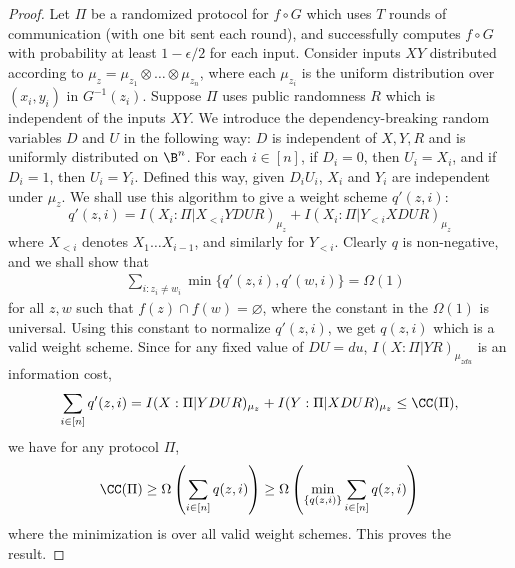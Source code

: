 \begin{proof}
Let $\Pi$ be a randomized protocol for $f\circ G$ which uses $T$ rounds
of communication (with one bit sent each round), and successfully computes $f\circ G$ with probability at least $1-\epsilon/2$ for each input. Consider inputs $XY$ distributed according to $\mu_z = \mu_{z_1}\otimes\ldots\otimes\mu_{z_n}$, where each $\mu_{z_i}$ is the uniform distribution over $(x_i,y_i)$ in $G^{-1}(z_i)$. Suppose $\Pi$ uses public randomness $R$ which is independent of the inputs $XY$. We introduce the dependency-breaking random variables $D$ and $U$ \cite{BJKS04} in the following way: $D$ is independent of $X, Y, R$ and is uniformly distributed on $\B^n$. For each $i \in [n]$, if $D_i=0$, then $U_i = X_i$, and if $D_i=1$, then $U_i=Y_i$. Defined this way, given $D_iU_i$, $X_i$ and $Y_i$ are independent under $\mu_z$. We shall use this algorithm to give a weight scheme $q'(z,i)$:
\[q'(z,i)=I(X_i:\Pi|X_{<i} YDUR)_{\mu_z} + I(X_i:\Pi|Y_{<i}XDUR)_{\mu_z}\]
where $X_{<i}$ denotes $X_1\ldots X_{i-1}$, and similarly for $Y_{<i}$. Clearly $q$ is non-negative, and we shall show that
\begin{align*}
& \sum_{i:z_i\neq w_i}\min\{q'(z,i),q'(w,i)\} = \Omega(1)
\end{align*}
for all $z,w$ such that $f(z) \cap f(w) = \varnothing$, where the constant in the $\Omega(1)$ is universal. Using this constant to normalize $q'(z,i)$, we get $q(z,i)$ which is a valid weight scheme. Since for any fixed value of $DU=du$, $I(X:\Pi|YR)_{\mu_{zdu}}$ is an information cost,
\[ \sum_{i \in [n]}q'(z,i) = I(X:\Pi|YDUR)_{\mu_z} + I(Y:\Pi|XDUR)_{\mu_z} \leq \CC(\Pi),\]
we have for any protocol $\Pi$,
\[ \CC(\Pi) \geq \Omega\left(\sum_{i \in [n]}q(z,i)\right) \geq \Omega\left(\min_{\{q(z,i)\}}\sum_{i \in [n]}q(z,i)\right) \]
where the minimization is over all valid weight schemes. This proves the result.


\end{proof}
